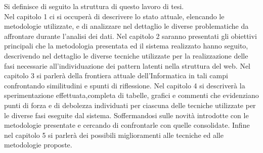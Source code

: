 Si definisce di seguito la struttura di questo lavoro di tesi.\\
Nel capitolo 1 ci si occuperà di descrivere lo stato attuale, elencando le metodologie utilizzate, e di analizzare nel dettaglio le diverse problematiche da affrontare durante l'analisi dei dati.
Nel capitolo 2 saranno presentati gli obiettivi principali che la metodologia presentata ed il sistema realizzato hanno seguito, descrivendo nel dettaglio le diverse tecniche utilizzate per la realizzazione delle fasi necessarie all'individuazione dei pattern latenti nella struttura del web.
Nel capitolo 3 si parlerà della frontiera attuale dell'Informatica in tali campi confrontando similitudini e spunti di riflessione.
Nel capitolo 4 si descriverà la sperimentazione effettuata,completa di tabelle, grafici e commenti che evidenziano punti di forza e di debolezza individuati per ciascuna delle tecniche utilizzate per le diverse fasi eseguite dal sistema. Soffermandosi sulle novità introdotte con le metodologie presentate e cercando di confrontarle con quelle consolidate.
Infine nel capitolo 5 si parlerà dei possibili miglioramenti alle tecniche ed alle metodologie proposte.


